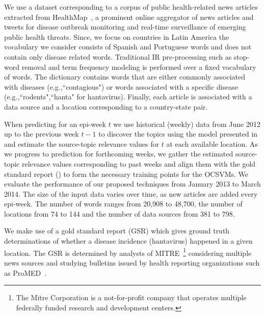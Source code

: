 \documentclass[twoside,leqno,twocolumn]{article}
\begin{document}
 We use a dataset corresponding to a corpus of public health-related news articles extracted from HealthMap~\cite{healthmap}, a prominent online aggregator of news articles and tweets for disease outbreak monitoring and real-time surveillance of emerging public health threats. Since, we focus on countries in Latin America the vocabulary we consider consists of Spanish and Portuguese words and does not contain only disease related words. Traditional IR pre-processing such as stop-word removal and term frequency modeling is performed over a fixed vocabulary of words. The dictionary contains words that are either commonly associated with diseases (e.g.,``contagious") or words associated with a specific disease (e.g.,``rodents",``hanta" for hantavirus). Finally, each article is associated with a data source and a location corresponding to a country-state pair.

When predicting for an epi-week $t$ we use historical (weekly) data from June 2012 up to the previous week $t-1$ to discover the topics using the model presented in  and estimate the source-topic relevance values for $t$ at each available location. As we progress to prediction for forthcoming weeks, we gather the estimated source-topic relevance values corresponding to past weeks and align them with the gold standard report () to  form the necessary training points for the OCSVMs. We evaluate the performance of our proposed techniques from January 2013 to March 2014. The size of the input data varies over time, as new articles are added every epi-week. The number of words ranges from 20,908 to 48,700, the number of locations from 74 to 144 and the number of data sources from 381 to 798.

 We make use of a gold standard report (GSR) which
gives ground truth determinations of whether a disease incidence
(hantavirus) happened in a given location. The GSR is determined by
analysts of MITRE~\footnote{The Mitre Corporation is a not-for-profit company that operates multiple federally funded research and development centers.} considering multiple news sources and studying bulletins issued by health reporting organizations such as ProMED~\cite{probmed}.
\end{document}
